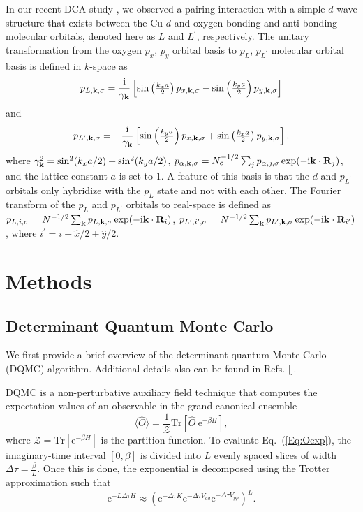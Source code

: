 \documentclass[reprint,nofootinbib,nobibnotes,amsmath,amssymb,aps,prb,floatfix]{revtex4-2}
\newcommand{\tr}{{\text {Tr} }}
\newcommand{\beq}{\begin{equation}}
\newcommand{\eeq}{\end{equation}}
\begin{document}
In our recent DCA study \cite{Mai}, we observed a pairing interaction with a simple $d$-wave structure that exists between the Cu $d$ and oxygen bonding and anti-bonding molecular orbitals, denoted here 
as $L$ and $L^\prime$, respectively. The unitary transformation \cite{ZR,Avella2013,Maier4} from the oxygen $p_x$, $p_y$ orbital basis to $p_L$, $p_{L^\prime}$ molecular orbital basis is defined in $k$-space as 
\begin{equation}
p_{L,{\bf k},\sigma}=\frac{\mathrm{i}}{\gamma_{{\bf k}}} \left[\sin\left(\tfrac{k_xa}{2}\right) p_{x,{\bf k},\sigma}- \sin\left(\tfrac{k_ya}{2}\right) p_{y,{\bf k},\sigma}\right]\label{Lk}
\end{equation}
and
\begin{equation}
p_{L^\prime,{\bf k},\sigma}=-\frac{\mathrm{i}}{\gamma_{{\bf k}}} \left[\sin\left(\tfrac{k_ya}{2}\right) p_{x,{\bf k},\sigma}+ \sin\left(\tfrac{k_xa}{2}\right) p_{y,{\bf k},\sigma}\right],\label{Lbark}
\end{equation}
where $\gamma^2_{{\bf k}}=\sin^2(k_xa/2)+\sin^2(k_ya/2)$,  $p_{\alpha,{\bf k},\sigma}=N^{-1/2}_c\sum_{j} p_{\alpha, j ,\sigma}\exp(-\mathrm{i} {\bf k} \cdot {\bf R}_j)$, and the lattice constant $a$ is set to $1$. A feature of this basis is that the $d$ and $p_{L^\prime}$ orbitals only hybridize with the $p_L$ state and not with each other. The Fourier transform of the $p_L$ and $p_{L^\prime}$ orbitals to real-space is defined as $p_{L,i,\sigma}=N^{-1/2} \sum_{\bf k}p_{L,{\bf k},\sigma} \exp(-\mathrm{i} {\bf k} \cdot {\bf R}_i)$, $p_{L^\prime,i^\prime,\sigma}=N^{-1/2} \sum_{\bf k}p_{L^\prime, {\bf k},\sigma} \exp(-\mathrm{i} {\bf k} \cdot {\bf R}_{i^\prime})$, where $i^\prime=i+\hat{x}/2+\hat{y}/2$.

\vskip 0.5cm 
\noindent
\section{Methods}
\subsection{Determinant Quantum Monte Carlo}  
We first provide a brief overview of the determinant quantum Monte Carlo (DQMC) algorithm. Additional details also can be found in Refs. [].  

DQMC is a non-perturbative auxiliary field technique that computes the expectation values of an observable in the grand canonical ensemble
\beq
\langle\hat{O}\rangle =
\frac{1}{\mathcal{Z}}\tr\left[\hat{O} \ \text{e}^{-\beta H}\right],\label{Eq:Oexp}
\eeq
where $\mathcal{Z} = \tr\left[ \text{e}^{-\beta H}\right]$ is the partition function. To evaluate Eq.~(\ref{Eq:Oexp}), the imaginary-time interval $\left[0,\beta\right]$ is divided into $L$ evenly spaced slices of width $\Delta\tau=\tfrac{\beta}{L}$. Once this is done, the exponential is decomposed using the Trotter approximation such that
\beq\nonumber
\text{e}^{-L\Delta\tau H} \approx ( \text{e}^{-\Delta\tau K} \text{e}^{-\Delta\tau V_{dd}} \text{e}^{-\Delta\tau V_{pp}})^L.
\eeq
\end{document}
